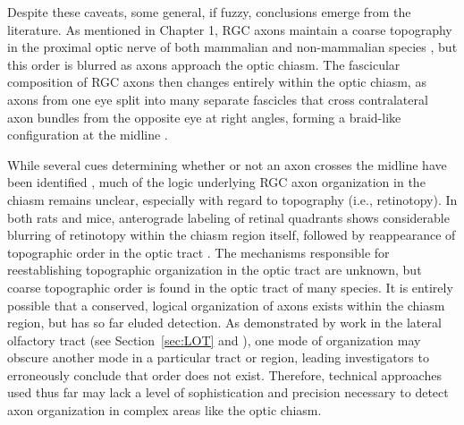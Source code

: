 Despite these caveats, some general, if fuzzy, conclusions emerge from the literature.
As mentioned in Chapter 1, RGC axons maintain a coarse topography in the proximal optic nerve of both mammalian \cite{horton1979non,naito1986course,simon1991relationship,reese1993reestablishment,chan1994changes,naito1994retinogeniculate,chan1999changes,plas2005pretarget} and non-mammalian species \cite{ehrlich1984course,montgomery1998organization}, but this order is blurred as axons approach the optic chiasm.
The fascicular composition of RGC axons then changes entirely within the optic chiasm, as axons from one eye split into many separate fascicles that cross contralateral axon bundles from the opposite eye at right angles, forming a braid-like configuration at the midline \cite{colello1998changing}.

While several cues determining whether or not an axon crosses the midline have been identified \cite{erskine2014connecting}, much of the logic underlying RGC axon organization in the chiasm remains unclear, especially with regard to topography (i.e., retinotopy).
In both rats and mice, anterograde labeling of retinal quadrants shows considerable blurring of retinotopy within the chiasm region itself, followed by reappearance of topographic order in the optic tract \cite{chan1994changes,chan1999changes}.
The mechanisms responsible for reestablishing topographic organization in the optic tract are unknown, but coarse topographic order is found in the optic tract of many species.
It is entirely possible that a conserved, logical organization of axons exists within the chiasm region, but has so far eluded detection.
As demonstrated by work in the lateral olfactory tract (see Section~\ref{sec:LOT} and ), one mode of organization may obscure another mode in a particular tract or region, leading investigators to erroneously conclude that order does not exist.
Therefore, technical approaches used thus far may lack a level of sophistication and precision necessary to detect axon organization in complex areas like the optic chiasm.

